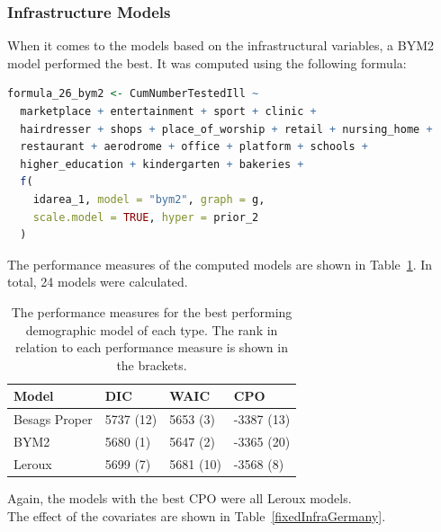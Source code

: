 \subsubsection{Infrastructure Models}
When it comes to the models based on the infrastructural variables, a BYM2 model performed the best. It was computed using the following formula: 
\begin{lstlisting}[caption={The formula for the best BYM2 model based on the infrastructural variables}, label={codeInfraGermany}, language=R]
formula_26_bym2 <- CumNumberTestedIll ~
  marketplace + entertainment + sport + clinic +
  hairdresser + shops + place_of_worship + retail + nursing_home +
  restaurant + aerodrome + office + platform + schools + 
  higher_education + kindergarten + bakeries + 
  f(
    idarea_1, model = "bym2", graph = g,
    scale.model = TRUE, hyper = prior_2
  )
\end{lstlisting}
The performance measures of the computed models are shown in Table~\ref{infraGermany}. In total, 24 models were calculated.
\begin{table}[H] 
\caption{The performance measures for the best performing demographic model of each type. The rank in relation to each performance measure is shown in the brackets. \label{infraGermany}}
\begin{tabular}{l l l l}
\toprule
\textbf{Model}	& \textbf{DIC}	& \textbf{WAIC} & \textbf{CPO} \\
\midrule
Besags Proper & 5737 (12) & 5653 (3) & -3387 (13)\\
BYM2 & 5680 (1) & 5647 (2) & -3365 (20)\\
Leroux & 5699 (7) & 5681 (10) & -3568 (8) \\
\bottomrule
\end{tabular}
\end{table}
Again, the models with the best CPO were all Leroux models. \\
The effect of the covariates are shown in Table~\ref{fixedInfraGermany}.
